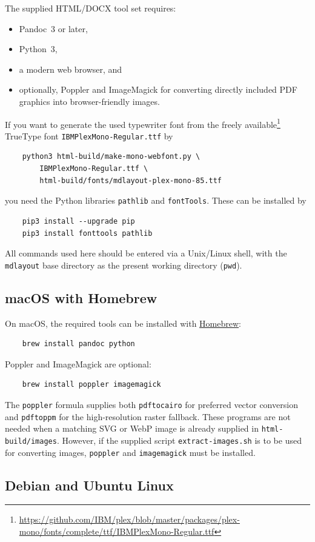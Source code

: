 \documentclass[
11pt,
a4paper,
oneside
]{scrbook}
\begin{document}
{The supplied HTML/DOCX tool set requires:
\begin{itemize}
	\item Pandoc~3 or later,
	\item Python~3,
	\item a modern web browser, and
	\item optionally, Poppler and ImageMagick for converting directly included
	PDF graphics into browser-friendly images.
\end{itemize}
If you want to generate the used typewriter font from the freely available\footnote{\url{https://github.com/IBM/plex/blob/master/packages/plex-mono/fonts/complete/ttf/IBMPlexMono-Regular.ttf}} TrueType font \texttt{IBMPlexMono-Regular.ttf} by
\begin{verbatim}
	python3 html-build/make-mono-webfont.py \ 
		IBMPlexMono-Regular.ttf \ 
		html-build/fonts/mdlayout-plex-mono-85.ttf
\end{verbatim} 
you need the Python libraries \texttt{pathlib} and \texttt{fontTools}. These can be installed by
\begin{verbatim}
	pip3 install --upgrade pip
	pip3 install fonttools pathlib
\end{verbatim}
All commands used here should be entered via a Unix/Linux shell, with the \texttt{mdlayout} base directory as the present working directory (\texttt{pwd}).
\subsection{macOS with Homebrew}

On macOS, the required tools can be installed with
\href{https://brew.sh}{Homebrew}:
\begin{verbatim}
	brew install pandoc python
\end{verbatim}
Poppler and ImageMagick are optional:
\begin{verbatim}
	brew install poppler imagemagick
\end{verbatim}
The \texttt{poppler} formula supplies both \texttt{pdftocairo} for preferred
vector conversion and \texttt{pdftoppm} for the high-resolution raster
fallback. These programs are not needed when a matching SVG or WebP image is
already supplied in \texttt{html-build/images}. However, if the supplied script \texttt{extract-images.sh} is to be used for converting images, \texttt{poppler} and \texttt{imagemagick} must be installed.

\subsection{Debian and Ubuntu Linux}

}
\end{document}
